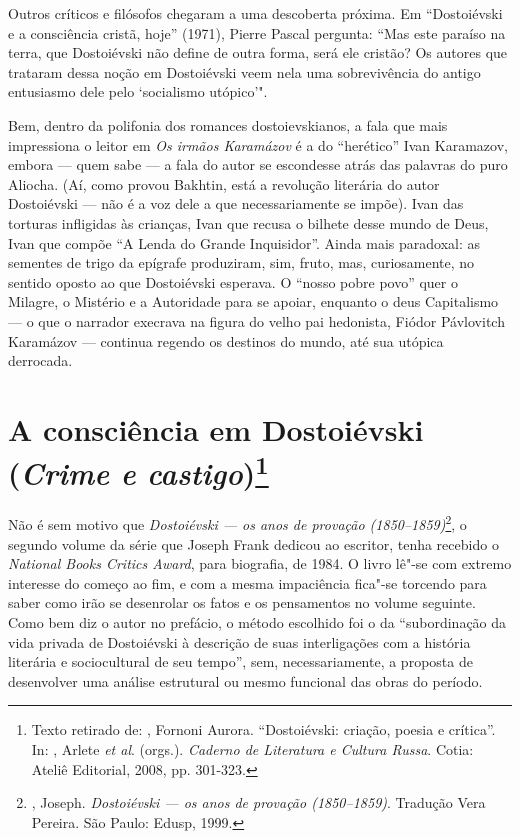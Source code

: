 Outros críticos e filósofos chegaram a uma descoberta próxima. Em
``Dostoiévski e a consciência cristã, hoje'' (1971), Pierre Pascal
pergunta: ``Mas este paraíso na terra, que Dostoiévski não define de
outra forma, será ele cristão? Os autores que trataram dessa noção em
Dostoiévski veem nela uma sobrevivência do antigo entusiasmo dele pelo
`socialismo utópico'".

Bem, dentro da polifonia dos romances dostoievskianos, a fala que mais
impressiona o leitor em \emph{Os irmãos Karamázov} é a do ``herético''
Ivan Karamazov, embora --- quem sabe --- a fala do autor se escondesse
atrás das palavras do puro Aliocha. (Aí, como provou Bakhtin, está a
revolução literária do autor Dostoiévski --- não é a voz dele a que
necessariamente se impõe). Ivan das torturas infligidas às crianças,
Ivan que recusa o bilhete desse mundo de Deus, Ivan que compõe ``A Lenda
do Grande Inquisidor''. Ainda mais paradoxal: as sementes de trigo da
epígrafe produziram, sim, fruto, mas, curiosamente, no sentido oposto ao
que Dostoiévski esperava. O ``nosso pobre povo'' quer o Milagre, o
Mistério e a Autoridade para se apoiar, enquanto o deus Capitalismo --- o
que o narrador execrava na figura do velho pai hedonista, Fiódor
Pávlovitch Karamázov --- continua regendo os destinos do mundo, até sua
utópica derrocada.

\chapter{A consciência em Dostoiévski (\emph{Crime e castigo})\footnote{Texto
  retirado de: , Fornoni Aurora. ``Dostoiévski: criação, poesia e crítica''. In: , Arlete \emph{et al}. (orgs.). \emph{Caderno de Literatura e Cultura Russa}. Cotia: Ateliê Editorial, 2008, pp. 301-323.}}

Não é sem motivo que \emph{Dostoiévski --- os anos de provação
(1850--1859)}\footnote{, Joseph. \emph{Dostoiévski --- os anos de
  provação (1850--1859)}. Tradução Vera Pereira. São Paulo: Edusp, 1999.},
o segundo volume da série que Joseph Frank dedicou ao escritor, tenha
recebido o \emph{National Books Critics Award}, para biografia, de 1984.
O livro lê"-se com extremo interesse do começo ao fim, e com a mesma
impaciência fica"-se torcendo para saber como irão se desenrolar os fatos
e os pensamentos no volume seguinte. Como bem diz o autor no prefácio, o
método escolhido foi o da ``subordinação da vida privada de Dostoiévski
à descrição de suas interligações com a história literária e
sociocultural de seu tempo'', sem, necessariamente, a proposta de
desenvolver uma análise estrutural ou mesmo funcional das obras do
período.

